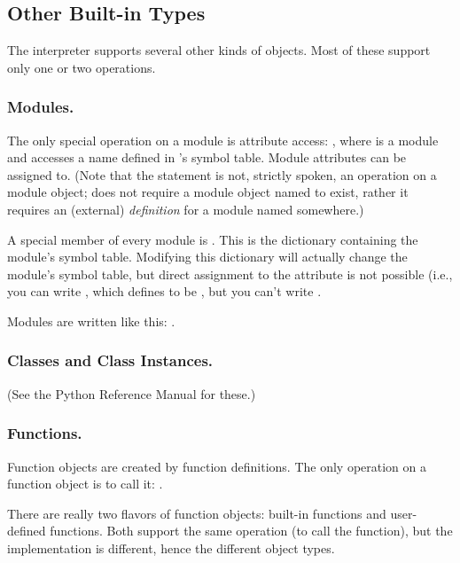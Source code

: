 \subsection{Other Built-in Types}

The interpreter supports several other kinds of objects.
Most of these support only one or two operations.

\subsubsection{Modules.}

The only special operation on a module is attribute access:
, where  is a module and  accesses
a name defined in 's symbol table.  Module attributes can be
assigned to.  (Note that the  statement is not, strictly
spoken, an operation on a module object;  does not
require a module object named  to exist, rather it requires
an (external) \emph{definition} for a module named 
somewhere.)

A special member of every module is .
This is the dictionary containing the module's symbol table.
Modifying this dictionary will actually change the module's symbol
table, but direct assignment to the  attribute is not
possible (i.e., you can write , which
defines  to be , but you can't write .

Modules are written like this: .

\subsubsection{Classes and Class Instances.}
(See the Python Reference Manual for these.)

\subsubsection{Functions.}

Function objects are created by function definitions.  The only
operation on a function object is to call it:
.

There are really two flavors of function objects: built-in functions
and user-defined functions.  Both support the same operation (to call
the function), but the implementation is different, hence the
different object types.

